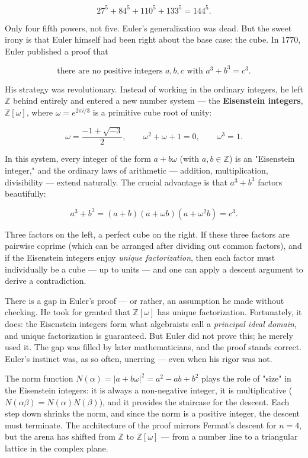 \documentclass[11pt,twoside,openright]{book}
\theoremstyle{definition}
\theoremstyle{remark}
\begin{document}
\[27^5 + 84^5 + 110^5 + 133^5 = 144^5.\]

Only four fifth powers, not five. Euler's generalization was dead. But the sweet irony is that Euler himself had been right about the base case: the cube. In 1770, Euler published a proof that

\[\text{there are no positive integers } a, b, c \text{ with } a^3 + b^3 = c^3.\]

His strategy was revolutionary. Instead of working in the ordinary integers, he left $\mathbb{Z}$ behind entirely and entered a new number system --- the \textbf{Eisenstein integers}, $\mathbb{Z}[\omega]$, where $\omega = e^{2\pi i / 3}$ is a primitive cube root of unity:

\[\omega = \frac{-1 + \sqrt{-3}}{2}, \qquad \omega^2 + \omega + 1 = 0, \qquad \omega^3 = 1.\]

In this system, every integer of the form $a + b\omega$ (with $a, b \in \mathbb{Z}$) is an "Eisenstein integer," and the ordinary laws of arithmetic --- addition, multiplication, divisibility --- extend naturally. The crucial advantage is that $a^3 + b^3$ factors beautifully:

\[a^3 + b^3 = (a + b)(a + \omega b)(a + \omega^2 b) = c^3.\]

Three factors on the left, a perfect cube on the right. If these three factors are pairwise coprime (which can be arranged after dividing out common factors), and if the Eisenstein integers enjoy \textit{unique factorization}, then each factor must individually be a cube --- up to units --- and one can apply a descent argument to derive a contradiction.


There is a gap in Euler's proof --- or rather, an assumption he made without checking. He took for granted that $\mathbb{Z}[\omega]$ has unique factorization. Fortunately, it does: the Eisenstein integers form what algebraists call a \textit{principal ideal domain}, and unique factorization is guaranteed. But Euler did not prove this; he merely used it. The gap was filled by later mathematicians, and the proof stands correct. Euler's instinct was, as so often, unerring --- even when his rigor was not.


The norm function $N(\alpha) = |a + b\omega|^2 = a^2 - ab + b^2$ plays the role of "size" in the Eisenstein integers: it is always a non-negative integer, it is multiplicative ($N(\alpha\beta) = N(\alpha)N(\beta)$), and it provides the staircase for the descent. Each step down shrinks the norm, and since the norm is a positive integer, the descent must terminate. The architecture of the proof mirrors Fermat's descent for $n = 4$, but the arena has shifted from $\mathbb{Z}$ to $\mathbb{Z}[\omega]$ --- from a number line to a triangular lattice in the complex plane.
\end{document}
